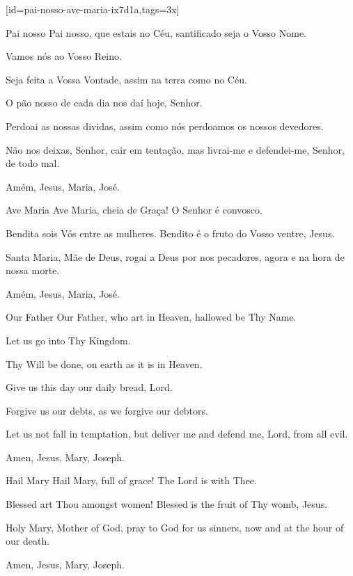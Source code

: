 \scleardpage
{}[id={pai-nosso-ave-maria-ix7d1a},tags={3x}]
  \vspace*{6ex}
  \begin{passage}[PT]{Pai nosso}
    Pai nosso,
    que estais no Céu,
    santificado seja o Vosso Nome.
    \par
    Vamos nós ao Vosso Reino.
    \par
    Seja feita a Vossa Vontade,
    assim na terra como no Céu.
    \par
    O pão nosso de cada dia nos daí hoje, Senhor.
    \par
    Perdoai as nossas dividas,
    assim como nós perdoamos os nossos devedores.
    \par
    Não nos deixas, Senhor, cair em tentação,
    mas livrai-me e defendei-me, Senhor,
    de todo mal.
    \par
    Amém, Jesus, Maria, José.
  \end{passage}
  \begin{passage}[PT]{Ave Maria}
    Ave Maria,
    cheia de Graça!
    O Senhor é convosco.
    \par
    Bendita sois Vós entre as mulheres.
    Bendito é o fruto do Vosso ventre, Jesus.
    \par
    Santa Maria, Mãe de Deus,
    rogai a Deus por nos pecadores,
    agora e na hora de nossa morte.
    \par
    Amém, Jesus, Maria, José.
  \end{passage}
  \vspace{\fill}
  \hardbrk
  \vspace*{11.5ex} %
  \begin{passage}[EN]{Our Father}
    Our Father,
    who art in Heaven,
    hallowed be Thy Name.
    \par
    Let us go into Thy Kingdom.
    \par
    Thy Will be done,
    on earth as it is in Heaven.
    \par
    Give us this day our daily bread, Lord.
    \par
    Forgive us our debts,
    as we forgive our debtors.
    \par
    Let us not fall in temptation,
    but deliver me and defend me, Lord,
    from all evil.
    \par
    Amen, Jesus, Mary, Joseph.
  \end{passage}
  \begin{passage}[EN]{Hail Mary}
    Hail Mary,
    full of grace!
    The Lord is with Thee.
    \par
    Blessed art Thou amongst women!
    Blessed is the fruit of Thy womb, Jesus.
    \par
    Holy Mary, Mother of God,
    pray to God for us sinners,
    now and at the hour of our death.
    \par
    Amen, Jesus, Mary, Joseph.
  \end{passage}
